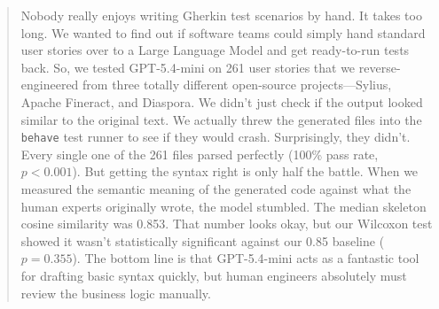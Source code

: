 
\begin{abstract}
Nobody really enjoys writing Gherkin test scenarios by hand. It takes too long. We wanted to find out if software teams could simply hand standard user stories over to a Large Language Model and get ready-to-run tests back. So, we tested GPT-5.4-mini on 261 user stories that we reverse-engineered from three totally different open-source projects---Sylius, Apache Fineract, and Diaspora. We didn't just check if the output looked similar to the original text. We actually threw the generated files into the \texttt{behave} test runner to see if they would crash. Surprisingly, they didn't. Every single one of the 261 files parsed perfectly (100\% pass rate, $p < 0.001$). But getting the syntax right is only half the battle. When we measured the semantic meaning of the generated code against what the human experts originally wrote, the model stumbled. The median skeleton cosine similarity was 0.853. That number looks okay, but our Wilcoxon test showed it wasn't statistically significant against our 0.85 baseline ($p = 0.355$). The bottom line is that GPT-5.4-mini acts as a fantastic tool for drafting basic syntax quickly, but human engineers absolutely must review the business logic manually.
\end{abstract}
